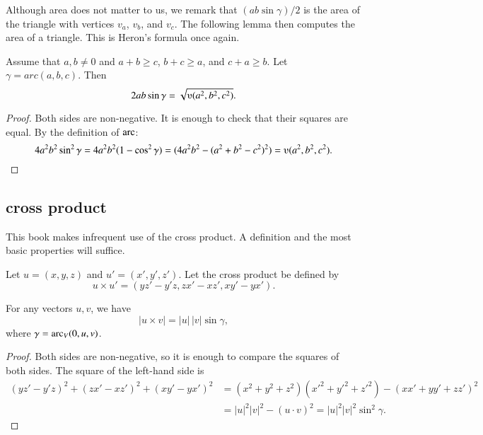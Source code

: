 Although area does not matter to us, we remark
that $(a b \sin\gamma)/2$ is the area of the
triangle with vertices $v_a$, $v_b$, and $v_c$.  The following
lemma then
computes the area of a triangle.  This is Heron's formula
once again.

\begin{lemma}
Assume that $a,b\ne 0$ and $a+b\ge c$, $b+c\ge a$, and $c+a\ge b$.
Let $\gamma=arc(a,b,c)$.  Then
        $$2 a b \sin\gamma = \sqrt{\ups(a^2,b^2,c^2)}.$$
\end{lemma}

\begin{proof}  Both sides are non-negative.  It is enough to check
that their squares are equal.  By the definition of $\operatorname{arc}$:
      $$4 a^2 b^2 \sin^2\gamma = 4 a^2 b^2 (1-\cos^2\gamma) = (4 a^2 b^2 - (a^2 + b^2 -
      c^2)^2) = \ups(a^2,b^2,c^2).$$
\end{proof}








\subsection{cross product}%

This book makes infrequent use of the cross product.
A definition and the most basic properties will suffice.

\begin{definition}   Let $u =(x,y,z)$ and $u' = (x',y',z')$.  
Let the cross product be defined
by
    $$
    u \times u' = (y z' - y' z, z x' - x z', x y' - y x').
    $$
\end{definition}

\begin{lemma}  
For any vectors $u,v$, we have 
    $$|u \times v| = |u|\,|v|\sin\gamma,$$
where $\gamma=\operatorname{arc}_V(0,u,v)$.
\end{lemma}

\begin{proof}
   Both sides are non-negative, so it is enough to compare the
   squares of both sides.  The square of the left-hand side is
   $$
   \begin{array}{lll}
   (y z'- y'z)^2 + (z x' - x z')^2 + (x y' - y x')^2 &=
   (x^2 + y^2 + z^2)(x'^2 + y'^2 + z'^2) - (x x' + y y' + z z')^2
   \\&= |u|^2|v|^2 - (u\cdot v)^2 = |u|^2|v|^2 \sin^2\gamma.
   \end{array}
   $$
\end{proof}


